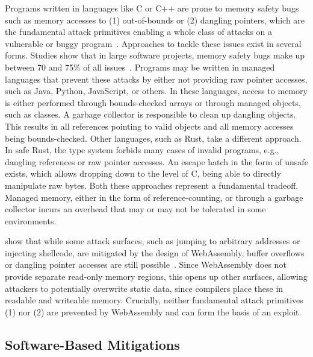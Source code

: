 Programs written in languages like C or C++ are prone to memory safety bugs such as memory accesses to (1) out-of-bounds or (2) dangling pointers, which are the fundamental attack primitives enabling a whole class of attacks on a vulnerable or buggy program~\cite{szekeres2013sok}.
Approaches to tackle these issues exist in several forms.
Studies show that in large software projects, memory safety bugs make up between 70 and 75\% of all issues~\cite{chromium_memory_safety,microsoft_memory_safety,android_memory_safety}.
Programs may be written in managed languages that prevent these attacks by either not providing raw pointer accesses, such as Java, Python, JavaScript, or others.
In these languages, access to memory is either performed through bounds-checked arrays or through managed objects, such as classes.
A garbage collector is responsible to clean up dangling objects.
This results in all references pointing to valid objects and all memory accesses being bounds-checked.
Other languages, such as Rust, take a different approach.
In safe Rust, the type system forbids many cases of invalid programs, e.g., dangling references or raw pointer accesses.
An escape hatch in the form of unsafe exists, which allows dropping down to the level of C, being able to directly manipulate raw bytes.
Both these approaches represent a fundamental tradeoff.
Managed memory, either in the form of reference-counting, or through a garbage collector incurs an overhead that may or may not be tolerated in some environments.

\citeauthor*{lehmann2020everything} show that while some attack surfaces, such as jumping to arbitrary addresses or injecting shellcode, are mitigated by the design of WebAssembly, buffer overflows or dangling pointer accesses are still possible~\cite{lehmann2020everything}.
Since WebAssembly does not provide separate read-only memory regions, this opens up other surfaces, allowing attackers to potentially overwrite static data, since compilers place these in readable and writeable memory.
Crucially, neither fundamental attack primitives (1) nor (2) are prevented by WebAssembly and can form the basis of an exploit.

\subsection{Software-Based Mitigations}
\label{subsec:software-based-mitigations}

